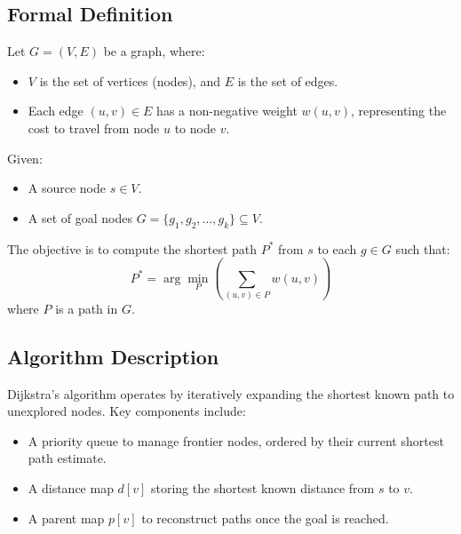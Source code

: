 \documentclass[12pt]{article}
\begin{document}
\subsection{Formal Definition}
Let \( G = (V, E) \) be a graph, where:
\begin{itemize}
    \item \( V \) is the set of vertices (nodes), and \( E \) is the set of edges.
    \item Each edge \( (u, v) \in E \) has a non-negative weight \( w(u, v) \), representing the cost to travel from node \( u \) to node \( v \).
\end{itemize}

\noindent Given:
\begin{itemize}
    \item A source node \( s \in V \).
    \item A set of goal nodes \( G = \{g_1, g_2, \dots, g_k\} \subseteq V \).
\end{itemize}

\noindent The objective is to compute the shortest path \( P^* \) from \( s \) to each \( g \in G \) such that:
\[
P^* = \arg\min_P \left( \sum_{(u,v) \in P} w(u,v) \right)
\]
\noindent where \( P \) is a path in \( G \).

\subsection{Algorithm Description}
Dijkstra's algorithm operates by iteratively expanding the shortest known path to unexplored nodes. Key components include:
\begin{itemize}
    \item A priority queue to manage frontier nodes, ordered by their current shortest path estimate.
    \item A distance map \( d[v] \) storing the shortest known distance from \( s \) to \( v \).
    \item A parent map \( p[v] \) to reconstruct paths once the goal is reached.
\end{itemize}
\end{document}
